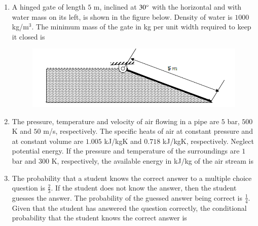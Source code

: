 \documentclass[journal]{IEEEtran}
\begin{document}
\begin{enumerate}[leftmargin=0pt]
\item A hinged gate of length $5$ m, inclined at $30\degree$ with the horizontal and with water mass on its left, is shown in the figure below. Density of water is $1000$ kg/m$^3$. The minimum mass of the gate in kg per unit width  required to keep it closed is
\begin{figure}[h]
\centering
\includegraphics[width=0.5\columnwidth]{Figs/image (17).png}
\caption*{}
\label{fig:43}
\end{figure}
\begin{enumerate}
\end{enumerate}

\hfill{}


\item The pressure, temperature and velocity of air flowing in a pipe are $5$ bar, $500$ K and $50$ m/s, respectively. The specific heats of air at constant pressure and at constant volume are $1.005$ kJ/kgK and $0.718$ kJ/kgK, respectively. Neglect potential energy. If the pressure and temperature of the surroundings are $1$ bar and $300$ K, respectively, the available energy in kJ/kg of the air stream is
\begin{enumerate}
\end{enumerate}
\hfill{}

\item The probability that a student knows the correct answer to a multiple choice question is $\frac{2}{3}$. If the student does not know the answer, then the student guesses the answer. The probability of the guessed answer being correct is $\frac14$. Given that the student has answered the question correctly, the conditional probability that the student knows the correct answer is
\begin{enumerate}
\end{enumerate}
\hfill{}


\end{enumerate}
\end{document}
